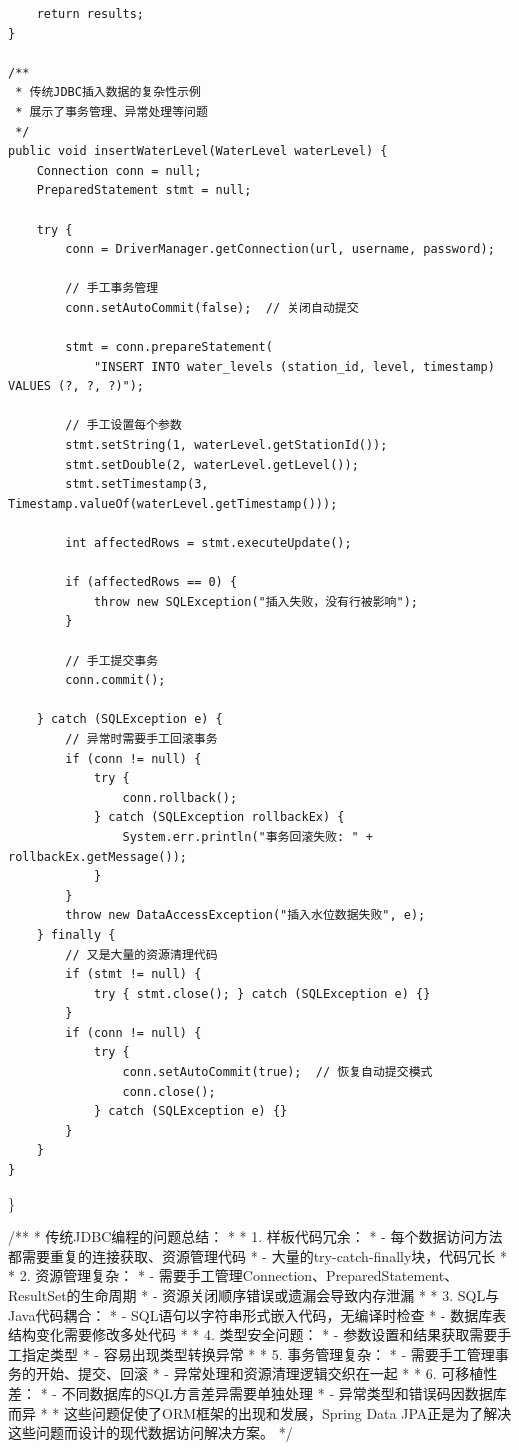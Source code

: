 \begin{verbatim}
    return results;
}

/**
 * 传统JDBC插入数据的复杂性示例
 * 展示了事务管理、异常处理等问题
 */
public void insertWaterLevel(WaterLevel waterLevel) {
    Connection conn = null;
    PreparedStatement stmt = null;
    
    try {
        conn = DriverManager.getConnection(url, username, password);
        
        // 手工事务管理
        conn.setAutoCommit(false);  // 关闭自动提交
        
        stmt = conn.prepareStatement(
            "INSERT INTO water_levels (station_id, level, timestamp) VALUES (?, ?, ?)");
        
        // 手工设置每个参数
        stmt.setString(1, waterLevel.getStationId());
        stmt.setDouble(2, waterLevel.getLevel());
        stmt.setTimestamp(3, Timestamp.valueOf(waterLevel.getTimestamp()));
        
        int affectedRows = stmt.executeUpdate();
        
        if (affectedRows == 0) {
            throw new SQLException("插入失败，没有行被影响");
        }
        
        // 手工提交事务
        conn.commit();
        
    } catch (SQLException e) {
        // 异常时需要手工回滚事务
        if (conn != null) {
            try {
                conn.rollback();
            } catch (SQLException rollbackEx) {
                System.err.println("事务回滚失败: " + rollbackEx.getMessage());
            }
        }
        throw new DataAccessException("插入水位数据失败", e);
    } finally {
        // 又是大量的资源清理代码
        if (stmt != null) {
            try { stmt.close(); } catch (SQLException e) {}
        }
        if (conn != null) {
            try { 
                conn.setAutoCommit(true);  // 恢复自动提交模式
                conn.close(); 
            } catch (SQLException e) {}
        }
    }
}
\end{verbatim}

\}

/** * 传统JDBC编程的问题总结： * * 1. 样板代码冗余： * - 每个数据访问方法都需要重复的连接获取、资源管理代码 * - 大量的try-catch-finally块，代码冗长 * * 2. 资源管理复杂： * - 需要手工管理Connection、PreparedStatement、ResultSet的生命周期 * - 资源关闭顺序错误或遗漏会导致内存泄漏 * * 3. SQL与Java代码耦合： * - SQL语句以字符串形式嵌入代码，无编译时检查 * - 数据库表结构变化需要修改多处代码 * * 4. 类型安全问题： * - 参数设置和结果获取需要手工指定类型 * - 容易出现类型转换异常 * * 5. 事务管理复杂： * - 需要手工管理事务的开始、提交、回滚 * - 异常处理和资源清理逻辑交织在一起 * * 6. 可移植性差： * - 不同数据库的SQL方言差异需要单独处理 * - 异常类型和错误码因数据库而异 * * 这些问题促使了ORM框架的出现和发展，Spring Data JPA正是为了解决这些问题而设计的现代数据访问解决方案。 */

